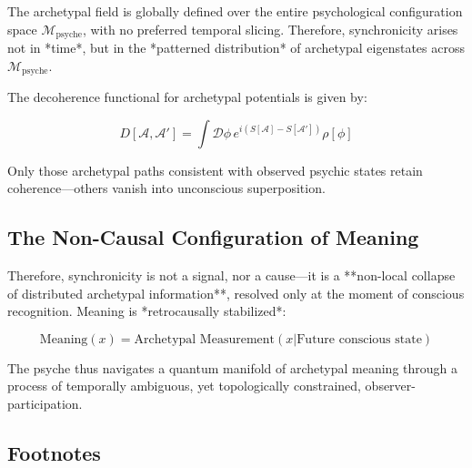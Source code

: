 \documentclass[12pt]{article}
\begin{document}
The archetypal field is globally defined over the entire psychological configuration space $\mathcal{M}_\text{psyche}$, with no preferred temporal slicing. Therefore, synchronicity arises not in *time*, but in the *patterned distribution* of archetypal eigenstates across $\mathcal{M}_\text{psyche}$.

The decoherence functional for archetypal potentials is given by:

\[
D[\mathcal{A}, \mathcal{A}'] = \int \mathcal{D}\phi \, e^{i(S[\mathcal{A}] - S[\mathcal{A}'])} \rho[\phi]
\]

Only those archetypal paths consistent with observed psychic states retain coherence—others vanish into unconscious superposition.

\subsection*{The Non-Causal Configuration of Meaning}

Therefore, synchronicity is not a signal, nor a cause—it is a **non-local collapse of distributed archetypal information**, resolved only at the moment of conscious recognition. Meaning is *retrocausally stabilized*:

\[
\text{Meaning}(x) = \text{Archetypal Measurement}(x | \text{Future conscious state})
\]

The psyche thus navigates a quantum manifold of archetypal meaning through a process of temporally ambiguous, yet topologically constrained, observer-participation.

\subsection*{Footnotes}
\end{document}
